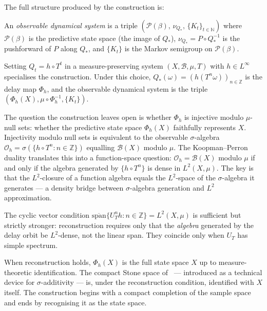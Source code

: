 The full structure produced by the construction is:

\begin{definition}
\label{def:obs-dyn-sys}
An \emph{observable dynamical system} is a triple
$(\mathcal{P}(\beta),\, \nu_{Q_*},\, \{K_t\}_{t \in \mathbb{N}})$
where $\mathcal{P}(\beta)$ is the predictive state space (the image of $Q_*$),
$\nu_{Q_*} = P \circ Q_*^{-1}$ is the pushforward of $P$ along $Q_*$, and
$\{K_t\}$ is the Markov semigroup on $\mathcal{P}(\beta)$.
\end{definition}

Setting $Q_t = h \circ T^t$ in a measure-preserving system
$(X, \mathcal{B}, \mu, T)$ with $h \in L^\infty$ specialises the construction.
Under this choice, $Q_*(\omega) = (h(T^n \omega))_{n \in \mathbb{Z}}$ is the
delay map $\Phi_h$, and the observable dynamical system is the triple
$(\Phi_h(X), \mu \circ \Phi_h^{-1}, \{K_t\})$.

The question the construction leaves open is whether $\Phi_h$ is injective
modulo $\mu$-null sets: whether the predictive state space $\Phi_h(X)$ faithfully
represents $X$.  Injectivity modulo null sets is equivalent to the observable
$\sigma$-algebra $\mathcal{O}_h = \sigma(\{h \circ T^n : n \in \mathbb{Z}\})$
equalling $\mathcal{B}(X)$ modulo $\mu$.  The Koopman--Perron duality translates
this into a function-space question: $\mathcal{O}_h = \mathcal{B}(X)$ modulo
$\mu$ if and only if the algebra generated by $\{h \circ T^n\}$ is dense in
$L^2(X, \mu)$.  The key is that the $L^2$-closure of a function algebra equals
the $L^2$-space of the $\sigma$-algebra it generates — a density bridge between
$\sigma$-algebra generation and $L^2$ approximation.

The cyclic vector condition
$\overline{\mathrm{span}}\{U_T^n h : n \in \mathbb{Z}\} = L^2(X, \mu)$ is
sufficient but strictly stronger: reconstruction requires only that the
\emph{algebra} generated by the delay orbit be $L^2$-dense, not the linear
span.  They coincide only when $U_T$ has simple spectrum.

When reconstruction holds, $\Phi_h(X)$ is the full state space $X$ up to
measure-theoretic identification.  The compact Stone space
of~\cite{mahon_paper1} — introduced as a technical device for
$\sigma$-additivity — is, under the reconstruction condition, identified with
$X$ itself.  The construction begins with a compact completion of the sample
space and ends by recognising it as the state space.



